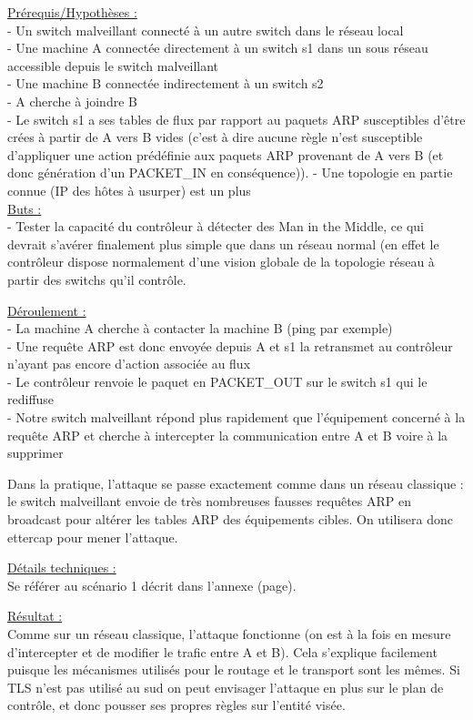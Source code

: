 \underline{Prérequis/Hypothèses :}\\
- Un switch malveillant connecté à un autre switch dans le réseau local\\
- Une machine A connectée directement à un switch s1 dans un sous réseau accessible depuis le switch malveillant\\
- Une machine B connectée indirectement à un switch s2\\
- A cherche à joindre B\\
- Le switch s1 a ses tables de flux par rapport au paquets ARP susceptibles d’être crées à partir de A vers B vides (c’est à dire aucune règle n’est susceptible d’appliquer une action prédéfinie aux paquets ARP provenant de A vers B (et donc génération d’un PACKET\_IN en conséquence)).
- Une topologie en partie connue (IP des hôtes à usurper) est un plus\\


\underline{Buts :}\\
- Tester la capacité du contrôleur à détecter des Man in the Middle, ce qui devrait s’avérer finalement plus simple que dans un réseau normal (en effet le contrôleur dispose normalement d’une vision globale de la topologie réseau à partir des switchs qu’il contrôle.

\underline{Déroulement :}\\
- La machine A cherche à contacter la machine B (ping par exemple)\\
- Une requête ARP est donc envoyée depuis A et s1 la retransmet au contrôleur n’ayant pas encore d’action associée au flux\\
- Le contrôleur renvoie le paquet en PACKET\_OUT sur le switch s1 qui le rediffuse\\
- Notre switch malveillant répond plus rapidement que l’équipement concerné à la requête ARP et cherche à intercepter la communication entre A et B voire à la supprimer

Dans la pratique, l'attaque se passe exactement comme dans un réseau classique : le switch malveillant envoie de très nombreuses fausses requêtes ARP en broadcast pour altérer les tables ARP des équipements cibles. On utilisera donc ettercap pour mener l'attaque.

\underline{Détails techniques :}\\
Se référer au scénario 1 décrit dans l'annexe (page).

\underline{Résultat :}\\
Comme sur un réseau classique, l'attaque fonctionne (on est à la fois en mesure d'intercepter et de modifier le trafic entre A et B). Cela s'explique facilement puisque les mécanismes utilisés pour le routage et le transport sont les mêmes. Si TLS n'est pas utilisé au sud on peut envisager l'attaque en plus sur le plan de contrôle, et donc pousser ses propres règles sur l'entité visée.


